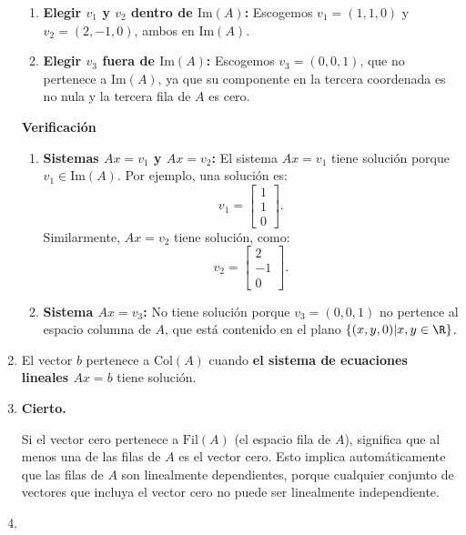 \begin{enumerate}[label=\color{red}\textbf{\arabic*)}]
\begin{enumerate}[label=\arabic*)]
            \item \textbf{Elegir $v_1$ y $v_2$ dentro de $\mathrm{Im}(A)$:} Escogemos $v_1=(1,1,0)$ y $v_2=(2,-1,0)$, ambos en $\mathrm{Im}(A)$.
            \item \textbf{Elegir $v_3$ fuera de $\mathrm{Im}(A)$:} Escogemos $v_3=(0,0,1)$, que no pertenece a $\mathrm{Im}(A)$, ya que su componente en la tercera coordenada es no nula y la tercera fila de $A$ es cero.
        \end{enumerate}
        \textbf{Verificación}
        \begin{enumerate}[label=\arabic*)]
            \item \textbf{Sistemas $Ax=v_1$ y $Ax=v_2$:} El sistema $Ax=v_1$ tiene solución porque $v_1\in \mathrm{Im}(A)$. Por ejemplo, una solución es: \[
            v_1=\begin{bmatrix} 
            1\\
            1\\
            0
            \end{bmatrix} .
            \]
            Similarmente, $Ax=v_2$ tiene solución, como: \[
            v_2=\begin{bmatrix} 
            2\\
            -1\\
            0
            \end{bmatrix} .
            \] 
        \item \textbf{Sistema $Ax=v_3$:} No tiene solución porque $v_3=(0,0,1)$ no pertence al espacio columna de $A$, que está contenido en el plano $\{(x,y,0)|x,y\in \R\} $.
        \end{enumerate}
    \item {}

        El vector $b$ pertenece a $\mathrm{Col}(A)$ cuando \textbf{el sistema de ecuaciones lineales $Ax=b$} tiene solución.
    \item {}

        \textbf{Cierto.}

        Si el vector cero pertenece a $\mathrm{Fil}(A)$ (el espacio fila de $A$), significa que al menos una de las filas de $A$ es el vector cero. Esto implica automáticamente que las filas de $A$ son linealmente dependientes, porque cualquier conjunto de vectores que incluya el vector cero no puede ser linealmente independiente.
    \item {} 


\end{enumerate}
